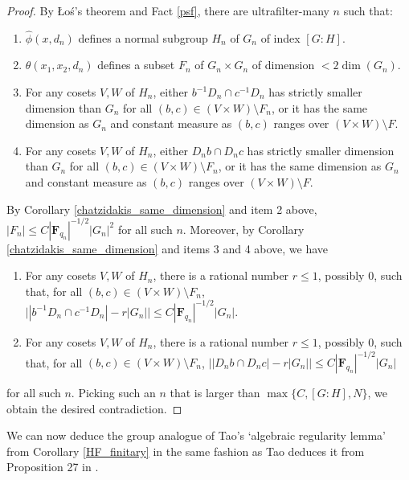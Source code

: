 \documentclass[10pt]{article}
\begin{document}
{\begin{proof}
    By Łoś's theorem and Fact \ref{psf}, there are ultrafilter-many $n$ such that:
    \begin{enumerate}
    \item $\widehat{\phi}(x,d_n)$ defines a normal subgroup $H_n$ of $G_n$ of index $[G:H]$.
    \item $\theta(x_1,x_2,d_n)$ defines a subset $F_n$ of $G_n\times G_n$ of dimension $<2\dim(G_n)$.
    \item For any cosets $V,W$ of $H_n$, either $b^{-1}D_n\cap c^{-1}D_n$ has strictly smaller dimension than $G_n$ for all $(b,c)\in (V\times W)\setminus F_n$, or it has the same dimension as $G_n$ and constant measure as $(b,c)$ ranges over $(V\times W)\setminus F$.
    \item For any cosets $V,W$ of $H_n$, either $D_nb\cap D_nc$ has strictly smaller dimension than $G_n$ for all $(b,c)\in (V\times W)\setminus F_n$, or it has the same dimension as $G_n$ and constant measure as $(b,c)$ ranges over $(V\times W)\setminus F$.
    \end{enumerate} By Corollary \ref{chatzidakis_same_dimension} and item 2 above, $|F_n|\leqslant C|\mathbf{F}_{q_n}|^{-1/2}|G_n|^2$ for all such $n$. Moreover, by Corollary \ref{chatzidakis_same_dimension} and items 3 and 4 above, we have
    \begin{enumerate}
        \item For any cosets $V,W$ of $H_n$, there is a rational number $r\leqslant 1$, possibly $0$, such that, for all $(b,c)\in (V\times W)\setminus F_n$, $\big||b^{-1}D_n\cap c^{-1}D_n|-r|G_n|\big|\leqslant C|\mathbf{F}_{q_n}|^{-1/2}|G_n|$.
        \item For any cosets $V,W$ of $H_n$, there is a rational number $r\leqslant 1$, possibly $0$, such that, for all $(b,c)\in (V\times W)\setminus F_n$, $\big||D_nb\cap D_nc|-r|G_n|\big|\leqslant C|\mathbf{F}_{q_n}|^{-1/2}|G_n|$
    \end{enumerate}for all such $n$. Picking such an $n$ that is larger than $\max\{C,[G:H],N\}$, we obtain the desired contradiction.
 \end{proof}
 
We can now deduce the group analogue of Tao's `algebraic regularity lemma' from Corollary \ref{HF_finitary} in the same fashion as Tao deduces it from Proposition 27 in \cite{tao}.

}
\end{document}
